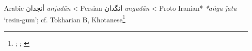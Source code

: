 \begin{etymology}\label{ety:anjudan}
Arabic {أنجدان} \textit{anjudān}
< Persian {انگدان} \textit{angudān}
< Proto-Iranian* \textit{*aṅgu-ǰatu-} `resin-gum'; cf. Tokharian B, Khotanese\footnote{\textcite[79-80]{lane_arabic-english_1863}; \textcite[114, 106]{steingass_comprehensive_1892}; \textcite[7]{adams_dictionary_2013}}
\end{etymology}